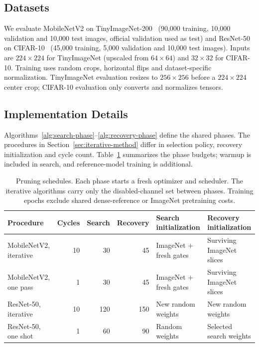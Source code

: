 \documentclass[sigplan,screen]{acmart}
\begin{document}
\subsection{Datasets}

We evaluate MobileNetV2 on TinyImageNet-200~\cite{le2015tiny}
(90,000 training, 10,000 validation and 10,000 test images, official validation
used as test) and ResNet-50 on CIFAR-10~\cite{krizhevsky2009learning}
(45,000 training, 5,000 validation and 10,000 test images). Inputs are $224\times224$ for TinyImageNet
(upscaled from $64\times64$) and $32\times32$ for CIFAR-10. Training
uses random crops, horizontal flips and dataset-specific normalization.
TinyImageNet evaluation resizes to $256\times256$ before a $224\times224$
center crop; CIFAR-10 evaluation only converts and normalizes tensors.

\subsection{Implementation Details}\label{sec:implementation}

Algorithms~\ref{alg:search-phase}--\ref{alg:recovery-phase} define the
shared phases. The procedures in Section~\ref{sec:iterative-method}
differ in selection policy, recovery initialization and cycle count.
Table~\ref{tab:pruning-schedules} summarizes the phase budgets; warmup is
included in search, and reference-model training is additional.

\begin{table}[t]
\centering\small
\caption{Pruning schedules. Each phase starts a fresh optimizer and scheduler.
The iterative algorithms carry only the disabled-channel set between phases.
Training epochs exclude shared dense-reference or ImageNet pretraining costs.}
\label{tab:pruning-schedules}
\begin{tabular}{@{}lrrrll@{}}\toprule
Procedure & Cycles & Search & Recovery & Search initialization & Recovery initialization \\\midrule
MobileNetV2, iterative & 10 & 30 & 45 & ImageNet + fresh gates & Surviving ImageNet slices \\
MobileNetV2, one pass & 1 & 30 & 45 & ImageNet + fresh gates & Surviving ImageNet slices \\
ResNet-50, iterative & 10 & 120 & 150 & New random weights & New random weights \\
ResNet-50, one shot & 1 & 60 & 90 & Random weights & Selected search weights \\
\bottomrule\end{tabular}
\end{table}
\end{document}
